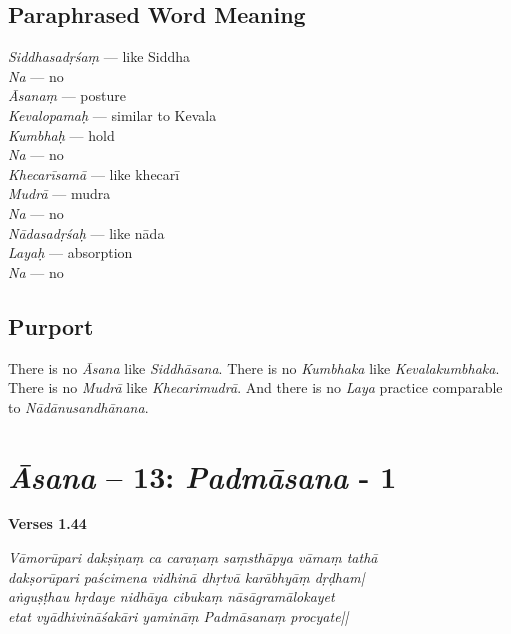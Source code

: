 \subsection*{Paraphrased Word Meaning}

\begin{multicols}{2}
\itemsep=0pt
\textit{Siddhasadṛśaṃ} --- like Siddha \\
\textit{Na} --- no \\
\textit{Āsanaṃ} --- posture  \\
\textit{Kevalopamaḥ} --- similar to Kevala  \\
\textit{Kumbhaḥ} ---  hold  \\
\textit{Na} --- no \\
\textit{Khecarīsamā} --- like khecarī   \\
\textit{Mudrā} --- mudra \\
\textit{Na} ---  no	 \\		
\textit{Nādasadṛśaḥ} --- like nāda	 \\
\textit{Layaḥ} --- absorption  \\
\textit{Na} --- no
\end{multicols}

\subsection*{Purport}

There is no \textit{Āsana} like \textit{Siddhāsana}. There is no \textit{Kumbhaka} like \textit{Kevalakumbhaka}. There is no \textit{Mudrā} like \textit{Khecarimudrā}. And there is no \textit{Laya} practice comparable to \textit{Nādānusandhānana}.


\section*{\textit{Āsana} -- 13: \textit{Padmāsana} - 1}

\noindent \textbf{Verses 1.44}

\begin{shloka}
\textit{Vāmorūpari dakṣiṇaṃ ca caraṇaṃ saṃsthāpya vāmaṃ tathā\\
dakṣorūpari paścimena vidhinā dhṛtvā karābhyāṃ dṛḍham|\\
aṅguṣṭhau hṛdaye nidhāya cibukaṃ nāsāgramālokayet\\
etat vyādhivināśakāri yamināṃ Padmāsanaṃ procyate||}
\end{shloka}
\vspace{-10pt}

